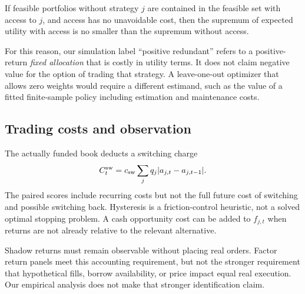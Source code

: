 \begin{proposition}\label{prop:optional}
If feasible portfolios without strategy $j$ are contained in the feasible set with access to $j$, and access has no unavoidable cost, then the supremum of expected utility with access is no smaller than the supremum without access.
\end{proposition}

For this reason, our simulation label ``positive redundant'' refers to a positive-return \emph{fixed allocation} that is costly in utility terms. It does not claim negative value for the option of trading that strategy. A leave-one-out optimizer that allows zero weights would require a different estimand, such as the value of a fitted finite-sample policy including estimation and maintenance costs.

\subsection{Trading costs and observation}
The actually funded book deducts a switching charge
\begin{equation}
 C_t^{\rm sw}=c_{\rm sw}\sum_jq_j|a_{j,t}-a_{j,t-1}|.
\end{equation}
The paired scores include recurring costs but not the full future cost of switching and possible switching back. Hysteresis is a friction-control heuristic, not a solved optimal stopping problem. A cash opportunity cost can be added to $f_{j,t}$ when returns are not already relative to the relevant alternative.

Shadow returns must remain observable without placing real orders. Factor return panels meet this accounting requirement, but not the stronger requirement that hypothetical fills, borrow availability, or price impact equal real execution. Our empirical analysis does not make that stronger identification claim.
